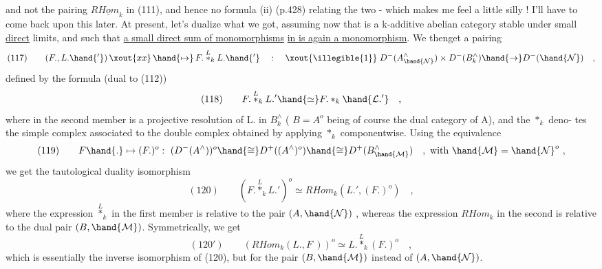 
and not the pairing $R\underline{Hom}_k$ in (111), and hence no formula (ii) (p.428)
relating the two - which makes me feel a little silly ! I'll have to
come back upon this later. \hand{$\rceil$} At present, let's dualize what we
got, assuming now that  is a k-additive abelian category stable under
small \uline{direct} limits, and such that \uline{a small direct sum of monomorphisms}
\uline{in  is again a monomorphism}. We thenget a pairing
\[ (117)\qquad (F.,L.\hand{'})\,\xout{xx}\,\hand{\mapsto}\, F.\overset{L}{*}_k L.\hand{'} \quad : \quad \xout{\illegible{1}}\; D^-(A^\wedge_{\hand{\mathcal{N}}}) \times D^-(B^\wedge_k) \hand{\to} D^-(\hand{\mathcal{N}}) \quad , \]
defined by the formula (dual to (112))
\[ (118)\qquad F.\overset{L}{*}_k L.' \hand{\simeq} F.*_k \hand{\mathcal{L}.'} \quad , \]
where in the second member  is a projective resolution of L. in
$B^\wedge_k$ ( $B = A^o$ being of course the dual category of A), and the $*_k$ deno-%
tes the simple complex associated to the double complex obtained by
applying $*_k$ componentwise. Using the  equivalence
\[ (119)\qquad F\hand{.}\mapsto(F.)^o :\ (D^-(A^\wedge))^o \hand{\cong} D^+((A^\wedge)^o) \hand{\cong} D^+(B^\wedge_{\hand{\mathcal{M}}}) \quad , \text{ with } \hand{\mathcal{M}} = \hand{\mathcal{N}}^o \ , \]
we get the tautological duality isomorphism
\[ (120)\qquad (F.\overset{L}{*}_k L.')^o \simeq RHom_k(L.',(F.)^o) \quad , \]
where the expression  $\overset{L}{*}_k$ in the first member is relative to the pair
$(A,\hand{\mathcal{N}})$ , whereas the expression $RHom_k$ in the second is relative to the
dual pair $(B,\hand{\mathcal{M}})$. Symmetrically, we get
\[ (120')\qquad (RHom_k(L.,F^{\cdot}))^o \simeq L.\overset{L}{*}_k (F.)^o \quad , \]
which is essentially the inverse isomorphism of (120), but for the pair
$(B,\hand{\mathcal{M}})$ instead of $(A,\hand{\mathcal{N}})$.

